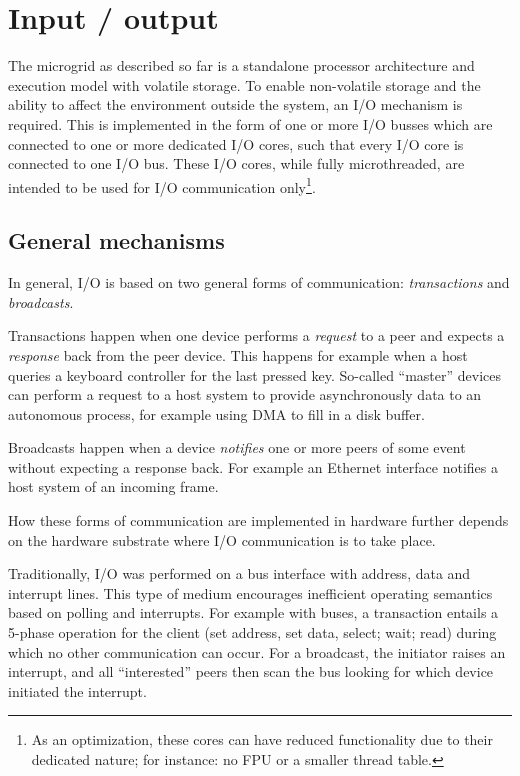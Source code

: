 \chapter{Input / output}

The microgrid as described so far is a standalone processor
architecture and execution model with volatile storage. To enable
non-volatile storage and the ability to affect the environment outside
the system, an I/O mechanism is required. This is implemented in the
form of one or more I/O busses which are connected to one or more
dedicated I/O cores, such that every I/O core is connected to one I/O
bus. These I/O cores, while fully microthreaded, are intended to be
used for I/O communication only\footnote{As an optimization, these
  cores can have reduced functionality due to their dedicated nature;
  for instance: no FPU or a smaller thread table.}.

\section{General mechanisms}

In general, I/O is based on two general forms of communication:
\emph{transactions} and \emph{broadcasts}. 

Transactions happen when one device performs a \emph{request} to a
peer and expects a \emph{response} back from the peer device. This
happens for example when a host queries a keyboard controller for the
last pressed key. So-called ``master'' devices can perform a request
to a host system to provide asynchronously data to an autonomous
process, for example using DMA to fill in a disk buffer.

Broadcasts happen when a device \emph{notifies} one or more peers of
some event without expecting a response back. For example an Ethernet
interface notifies a host system of an incoming frame.

How these forms of communication are implemented in hardware further
depends on the hardware substrate where I/O communication is to take
place.

Traditionally, I/O was performed on a bus interface with address, data
and interrupt lines. This type of medium encourages inefficient
operating semantics based on polling and interrupts. For example with
buses, a transaction entails a 5-phase operation for the client (set
address, set data, select; wait; read) during which no other
communication can occur. For a broadcast, the initiator raises an
interrupt, and all ``interested'' peers then scan the bus looking for
which device initiated the interrupt.

